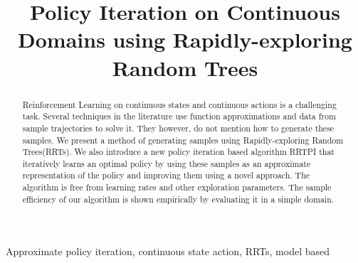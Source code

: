 \documentclass[wcp]{jmlr}
\title[RRTPI]{Policy Iteration on Continuous Domains using Rapidly-exploring Random Trees}
\begin{document}
\maketitle

\begin{abstract}
Reinforcement Learning on continuous states and continuous actions is a challenging task. Several techniques in the literature use function approximations and data from sample trajectories to solve it. They however, do not mention how to generate these samples. We present a method of generating samples using Rapidly-exploring Random Trees(RRTs). We also introduce a new policy iteration based algorithm RRTPI that iteratively learns an optimal policy by using these samples as an approximate representation of the policy and improving them using a novel approach. The algorithm is free from learning rates and other exploration parameters. The sample efficiency of our algorithm is shown empirically by evaluating it in a simple domain.
\end{abstract}
\begin{keywords}
Approximate policy iteration, continuous state action, RRTs, model based
\end{keywords}
\end{document}
